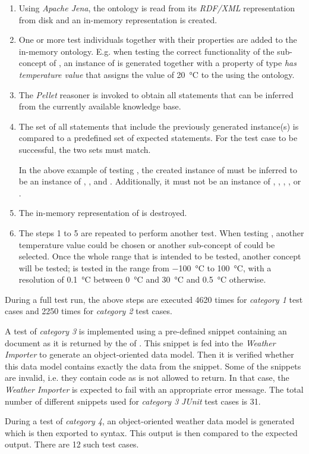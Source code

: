 \begin{enumerate}
  \item Using \emph{Apache Jena}, the \smarthomeweather ontology is read from its \emph{RDF/XML} representation from disk and an in-memory representation is created.
  \item One or more test individuals together with their properties are added to the in-memory ontology. E.g. when testing the correct functionality of the sub-concept  of , an instance of  is generated together with a property of type \emph{has temperature value} that assigns the value of \SI{20}{\celsius} to the  using the \muo ontology.
  \item The \emph{Pellet} reasoner is invoked to obtain all statements that can be inferred from the currently available knowledge base.
  \item The set of all statements that include the previously generated instance(s) is compared to a predefined set of expected statements. For the test case to be successful, the two sets must match.
  
  In the above example of testing , the created instance of  must be inferred to be an instance of , , and . Additionally, it must not be an instance of , , , , or .
  \item The in-memory representation of \smarthomeweather is destroyed.
  \item The steps 1 to 5 are repeated to perform another test. When testing , another temperature value could be chosen or another sub-concept of  could be selected.
  Once the whole range that is intended to be tested, another concept will be tested; %
   is tested in the range from \SI{-100}{\celsius} to \SI{100}{\celsius}, with a resolution of \SI{0.1}{\celsius} between \SI{0}{\celsius} and \SI{30}{\celsius} and \SI{0.5}{\celsius} otherwise.
\end{enumerate}

During a full test run, the above steps are executed \num{4620} times for \emph{category 1} test cases and \num{2250} times for \emph{category 2} test cases.

A test of \emph{category 3} is implemented using a pre-defined snippet containing an  document as it is returned by the  of \yrno. This snippet is fed into the \emph{Weather Importer} to generate an object-oriented data model. Then it is verified whether this data model contains exactly the data from the snippet. Some of the snippets are invalid, i.e. they contain  code as \yrno is not allowed to return. %
In that case, the \emph{Weather Importer} is expected to fail with an appropriate error message. The total number of different snippets used for \emph{category 3} \emph{JUnit} test cases is \num{31}.

During a test of \emph{category 4}, an object-oriented weather data model is generated which is then exported to  syntax. This output is then compared to the expected output. There are \num{12} such test cases.
